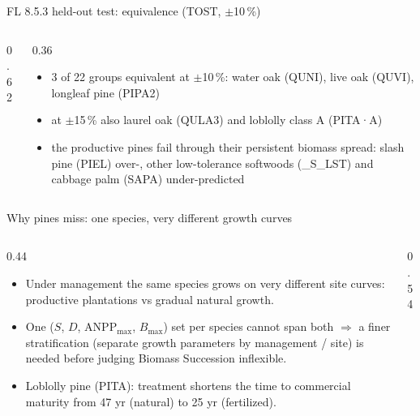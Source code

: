 \begin{frame}{FL 8.5.3 held-out test: equivalence (TOST, $\pm$10\,\%)}
\begin{columns}[T]
\begin{column}{0.62\textwidth}
\end{column}
\begin{column}{0.36\textwidth}
\small
\begin{itemize}\setlength\itemsep{3pt}
\item 3 of 22 groups equivalent at $\pm$10\,\%: water oak (QUNI), live oak (QUVI), longleaf pine (PIPA2)
\item at $\pm$15\,\% also laurel oak (QULA3) and loblolly class A (PITA·A)
\item the productive pines fail through their persistent biomass spread: slash pine (PIEL) over-, other low-tolerance softwoods (\_S\_LST) and cabbage palm (SAPA) under-predicted
\end{itemize}
\end{column}
\end{columns}
\end{frame}

\begin{frame}{Why pines miss: one species, very different growth curves}
\begin{columns}[T]
\begin{column}{0.44\textwidth}
\small
\begin{itemize}\setlength\itemsep{3pt}
\item Under management the same species grows on very different site curves: productive plantations vs gradual natural growth.
\item One ($S$, $D$, ANPP$_{\max}$, $B_{\max}$) set per species cannot span both $\Rightarrow$ a finer stratification (separate growth parameters by management / site) is needed before judging Biomass Succession inflexible.
\item Loblolly pine (PITA): treatment shortens the time to commercial maturity from 47 yr (natural) to 25 yr (fertilized).
\end{itemize}
\end{column}
\begin{column}{0.54\textwidth}
\end{column}
\end{columns}
\end{frame}

